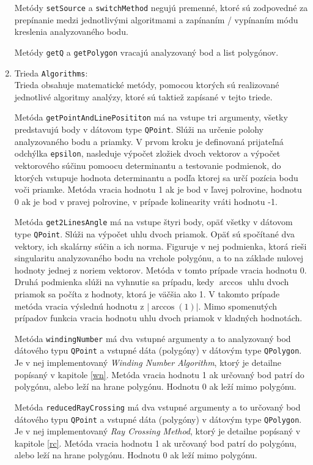 \documentclass[11pt]{article}
\begin{document}
\begin{enumerate}
Metódy \texttt{setSource} a \texttt{switchMethod} negujú premenné, ktoré sú zodpovedné za prepínanie medzi jednotlivými algoritmami a zapínaním / vypínaním módu kreslenia analyzovaného bodu.

Metódy \texttt{getQ} a \texttt{getPolygon} vracajú analyzovaný bod a list polygónov.

    \item Trieda \texttt{Algorithms}:\\
Trieda obsahuje matematické metódy, pomocou ktorých sú realizované jednotlivé algoritmy analýzy, ktoré sú taktiež zapísané v tejto triede.

\newpage

Metóda \texttt{getPointAndLinePosititon} má na vstupe tri argumenty, všetky predstavujú body v dátovom type \texttt{QPoint}. Slúži na určenie polohy analyzovaného bodu a priamky. \newline
V prvom kroku je definovaná prijateľná odchýlka \texttt{epsilon}, nasleduje výpočet zložiek dvoch vektorov a výpočet vektorového súčinu pomoocu determinantu a testovanie podmienok, do ktorých vstupuje hodnota determinantu a podľa ktorej sa určí pozícia bodu voči priamke. \newline
Metóda vracia hodnotu 1 ak je bod v ľavej polrovine, hodnotu 0 ak je bod v pravej polrovine, v prípade kolinearity vráti hodnotu -1.

Metóda \texttt{get2LinesAngle} má na vstupe štyri body, opäť všetky v dátovom type \texttt{QPoint}. Slúži na výpočet uhlu dvoch priamok. Opäť sú spočítané dva vektory, ich skalárny súčin a ich norma. \newline
Figuruje v nej podmienka, ktorá rieši singularitu analyzovaného bodu na vrchole polygónu, a to na základe nulovej hodnoty jednej z noriem vektorov. Metóda v tomto prípade vracia hodnotu 0.\newline
Druhá podmienka slúži na vyhnutie sa prípadu, kedy $\arccos$ uhlu dvoch priamok sa počíta z hodnoty, ktorá je väčšia ako 1. V takomto prípade metóda vracia výslednú hodnotu z $|\arccos(1)|$.\newline
Mimo spomenutých prípadov funkcia vracia hodnotu uhlu dvoch priamok v kladných hodnotách.

Metóda \texttt{windingNumber} má dva vstupné argumenty a to analyzovaný bod dátového typu \texttt{QPoint} a vstupné dáta (polygóny) v dátovým type \texttt{QPolygon}. Je v nej implementovaný \textit{Winding Number Algorithm}, ktorý je detailne popísaný v kapitole \ref{wn}.\newline
Metóda vracia hodnotu 1 ak určovaný bod patrí do polygónu, alebo leží na hrane polygónu. Hodnotu 0 ak leží mimo polygónu.

Metóda \texttt{reducedRayCrossing} má dva vstupné argumenty a to určovaný bod dátového typu \texttt{QPoint} a vstupné dáta (polygóny) v dátovým type \texttt{QPolygon}. Je v nej implementovaný \textit{Ray Crossing Method}, ktorý je detailne popísaný v kapitole \ref{rc}.\newline
Metóda vracia hodnotu 1 ak určovaný bod patrí do polygónu, alebo leží na hrane polygónu. Hodnotu 0 ak leží mimo polygónu.
\end{enumerate}
\end{document}
